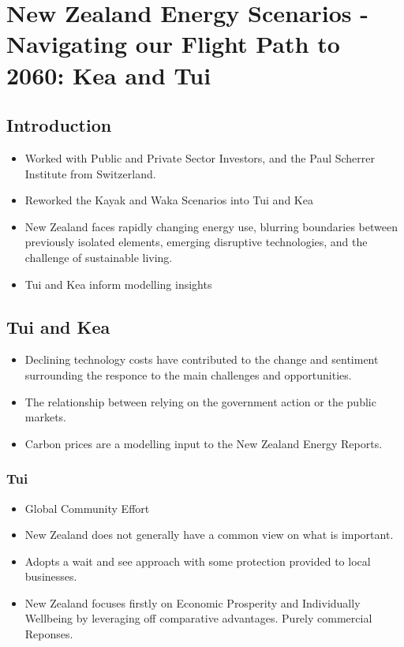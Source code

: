\documentclass[12pt]{article}
\begin{document}
    \section{New Zealand Energy Scenarios - Navigating our Flight Path to 2060: Kea and Tui}
    \subsection{Introduction}
    \begin{itemize}
        \item Worked with Public and Private Sector Investors, and the Paul Scherrer Institute from Switzerland.
        \item Reworked the Kayak and Waka Scenarios into Tui and Kea
        \item New Zealand faces rapidly changing energy use, blurring boundaries between previously isolated elements, 
        emerging disruptive technologies, and the challenge of sustainable living.
        \item Tui and Kea inform modelling insights
    \end{itemize}
    \subsection{Tui and Kea}
    \begin{itemize}
        \item Declining technology costs have contributed to the change and sentiment surrounding the responce to
              the main challenges and opportunities.
        \item The relationship between relying on the government action or the public markets.
        \item Carbon prices are a modelling input to the New Zealand Energy Reports.
    \end{itemize}
    \subsubsection{Tui}
    \begin{itemize}
        \item Global Community Effort
        \item New Zealand does not generally have a common view on what is important.
        \item Adopts a wait and see approach with some protection provided to local businesses.
        \item New Zealand focuses firstly on Economic Prosperity and Individually Wellbeing by 
        leveraging off comparative advantages. Purely commercial Reponses.
    \end{itemize}
\end{document}
